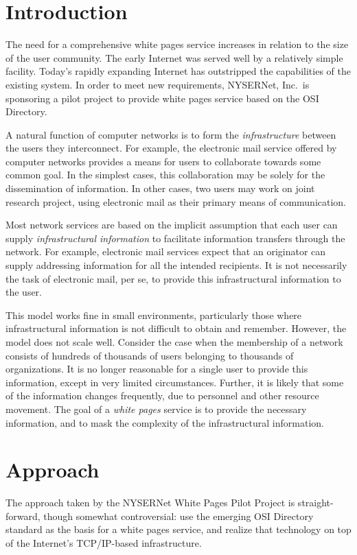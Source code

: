 
\newpage
\section	{Introduction}
The need for a comprehensive white pages service increases in relation to the
size of the user community.
The early Internet was served well by a relatively simple facility.
Today's rapidly expanding Internet has outstripped the capabilities of the
existing system.
In order to meet new requirements,
NYSERNet, Inc.~is sponsoring a pilot project to provide white pages
service based on the OSI Directory.

A natural function of computer networks is to form the {\em infrastructure\/}
between the users they interconnect.
For example,
the electronic mail service offered by computer networks provides a means for
users to collaborate towards some common goal.
In the simplest cases,
this collaboration may be solely for the dissemination of information.
In other cases,
two users may work on joint research project,
using electronic mail as their primary means of communication.

Most network services are based on the implicit assumption that each user can
supply {\em infrastructural information} to 
facilitate information transfers through the network.
For example,
electronic mail services expect that an originator can supply 
addressing information 
for all the intended recipients.
It is not necessarily the task of electronic mail, per se,
to provide this infrastructural information to the user.

This model works fine in small environments,
particularly those where infrastructural information is not difficult to 
obtain and remember.
However,
the model does not scale well.
Consider the case when the membership of a network consists of hundreds of
thousands of users belonging to thousands of organizations.
It is no longer reasonable for a single user to provide this information,
except in very limited circumstances.
Further,
it is likely that some of the information changes frequently,
due to personnel and other resource movement.
The goal of a {\em white pages\/} service is to 
provide the necessary information, and to mask the complexity of the
infrastructural information.

\newpage
\section	{Approach}
The approach taken by the NYSERNet White Pages Pilot Project is
straight-forward, though somewhat controversial:
use the emerging OSI Directory standard as the basis for a white pages
service, and realize that technology on top of the Internet's TCP/IP-based
infrastructure.

